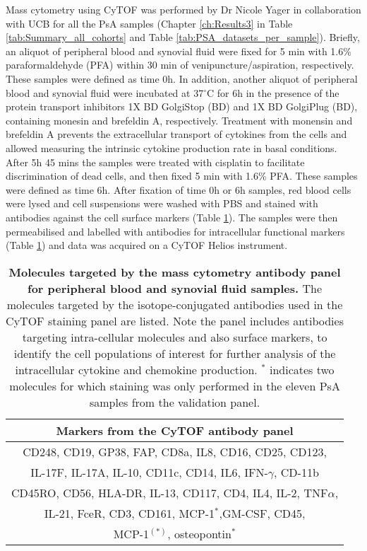 Mass cytometry using CyTOF was performed by Dr Nicole Yager in collaboration with UCB for all the PsA samples (Chapter \ref{ch:Results3} in Table \ref{tab:Summary_all_cohorts} and Table \ref{tab:PSA_datasets_per_sample}). Briefly, an aliquot of peripheral blood and synovial fluid were fixed for 5 min with 1.6\% paraformaldehyde (PFA) within 30 min of venipuncture/aspiration, respectively. These samples were defined as time 0h. In addition, another aliquot of peripheral blood and synovial fluid were incubated at 37{$^\circ$}C for 6h in the presence of the protein transport inhibitors 1X BD GolgiStop (BD) and 1X BD GolgiPlug (BD), containing monesin and brefeldin A, respectively. Treatment with monensin and brefeldin A prevents the extracellular transport of cytokines from the cells and allowed measuring the intrinsic cytokine production rate in basal conditions. After 5h 45 mins the samples were treated with cisplatin to facilitate discrimination of dead cells, and then fixed 5 min with 1.6\% PFA. These samples were defined as time 6h. After fixation of time 0h or 6h samples, red blood cells were lysed and cell suspensions were washed with PBS and stained with antibodies against the cell surface markers (Table \ref{tab:CyTOF}). The samples were then permeabilised and labelled with antibodies for intracellular functional markers (Table \ref{tab:CyTOF}) and data was acquired on a CyTOF Helios instrument. 



\begin{table}[htbp]
\setlength{\tabcolsep}{20pt}
\renewcommand{\arraystretch}{1.5}
\begin{tabular}{@{} c}
\toprule
\textbf{Markers from the CyTOF antibody panel} \\
\midrule
\midrule
CD248, CD19, GP38, FAP, CD8a, IL8, CD16, CD25, CD123,\\
IL-17F, IL-17A, IL-10, CD11c, CD14, IL6, IFN-$\gamma$, CD-11b\\
CD45RO, CD56, HLA-DR, IL-13, CD117, CD4, IL4, IL-2, TNF$\alpha$,\\
IL-21, FceR, CD3, CD161, MCP-1$^{\ast}$,GM-CSF, CD45, \\
MCP-1$^{(\ast)}$, osteopontin$^{\ast}$\\ 
\end{tabular}
\medskip %
\caption[Molecules targeted by the mass cytometry antibody panel for peripheral blood and synovial fluid samples.]{\textbf{Molecules targeted by the mass cytometry antibody panel for peripheral blood and synovial fluid samples.} The molecules targeted by the isotope-conjugated antibodies used in the CyTOF staining panel are listed. Note the panel includes antibodies targeting intra-cellular molecules and also surface markers, to identify the cell populations of interest for further analysis of the intracellular cytokine and chemokine production. $^{\ast}$ indicates two molecules for which staining was only performed in the eleven PsA samples from the validation panel.}
\label{tab:CyTOF}
\end{table}
\bigskip %




